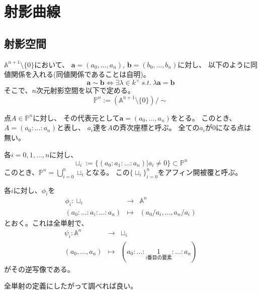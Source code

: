 \documentclass[a4]{article}
\newcommand{\affine}{\mathbb{A}}
\newcommand{\proj}{\mathbb{P}}
\begin{document}
    \section{射影曲線}
        \subsection{射影空間}
        $\affine^{n+1} \setminus \{ 0 \}$において、
        $\mathbf{a}=(a_0, \dots, a_n)$, $\mathbf{b}=(b_0, \dots, b_n)$に対し、
        以下のように同値関係を入れる(同値関係であることは自明)。
        \[
        \mathbf{a} \sim \mathbf{b} \iff \exists \lambda \in k^{\times} ~s.t.~ \lambda \mathbf{a}=\mathbf{b}
        \]
        そこで、$n$次元射影空間を以下で定める。
        \[
        \mathbb{P}^n := (\affine^{n+1} \setminus \{ 0 \}) / \sim
        \]
        
        点$A \in \proj^n$に対し、
        その代表元として$\mathbf{a}=(a_0, \dots, a_n)$をとる。
        このとき、$A=(a_0 : \dots : a_n)$と表し、
        $a_i$達を$A$の斉次座標と呼ぶ。
        全ての$a_i$が0になる点は無い。
        
        各$i=0, 1, \dots, n$に対し、
        \[
            \sqcup_i:=\{(a_0: a_1: \dots: a_n) | a_i \neq 0\} \subset \proj^n
        \]
        このとき、$\proj^n = \bigcup_{i=0}^{n}{\sqcup_i}$となる。
        この$\{\sqcup_i \}_{i=0}^{n}$をアフィン開被覆と呼ぶ。
        
        \begin{Lemma}
            各$i$に対し、$\phi_i$を
            \begin{eqnarray*}
                \phi_{i} :
                \sqcup_i &\to& \affine^n \\
                (a_0: \dots: a_i: \dots: a_n) &\mapsto& (a_0/a_i, \dots, a_n/a_i)
            \end{eqnarray*}
            とおく。これは全単射で、
            \begin{eqnarray*}
                \psi_{i} :
                \affine^n &\to& \sqcup_i \\
                (a_0, \dots, a_n) &\mapsto& (a_0: \dots: \underset{\text{$i$番目の要素}}{1}: \dots: a_n)
            \end{eqnarray*}
            がその逆写像である。
        \end{Lemma}
        
        \begin{Proof}
            全単射の定義にしたがって調べれば良い。 \QED
        \end{Proof}
        
\end{document}
